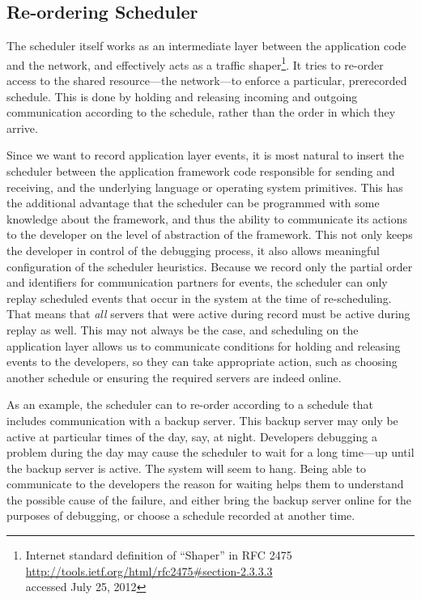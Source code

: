 \subsection{Re-ordering Scheduler}
\label{sec:re-order-sched}

The scheduler itself works as an intermediate layer between the
application code and the network, and effectively acts as a traffic
shaper\footnote{Internet standard definition of ``Shaper'' in RFC
  2475\\
  \url{http://tools.ietf.org/html/rfc2475\#section-2.3.3.3}\\
  accessed July 25, 2012}. It tries to re-order access to the shared
resource---the network---to enforce a particular, prerecorded
schedule. This is done by holding and releasing incoming and outgoing
communication according to the schedule, rather than the order in
which they arrive.

Since we want to record application layer events, it is most natural
to insert the scheduler between the application framework code
responsible for sending and receiving, and the underlying language or
operating system primitives. This has the additional advantage that
the scheduler can be programmed with some knowledge about the
framework, and thus the ability to communicate its actions to the
developer on the level of abstraction of the framework. This not only
keeps the developer in control of the debugging process, it also
allows meaningful configuration of the scheduler heuristics. Because
we record only the partial order and identifiers for communication
partners for events, the scheduler can only replay scheduled events
that occur in the system at the time of re-scheduling. That means that
\emph{all} servers that were active during record must be active
during replay as well. This may not always be the case, and scheduling
on the application layer allows us to communicate conditions for
holding and releasing events to the developers, so they can take
appropriate action, such as choosing another schedule or ensuring the
required servers are indeed online.

As an example, the scheduler can to re-order according to a schedule
that includes communication with a backup server. This backup server
may only be active at particular times of the day, say, at
night. Developers debugging a problem during the day may cause the
scheduler to wait for a long time---up until the backup server is
active. The system will seem to hang. Being able to communicate to the
developers the reason for waiting helps them to understand the
possible cause of the failure, and either bring the backup server
online for the purposes of debugging, or choose a schedule recorded at
another time.

